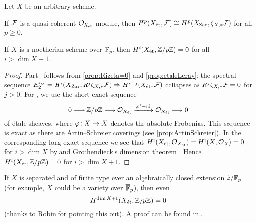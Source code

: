 \begin{cor}\label{cor:etaleCoho=ZariskiCoho}
	Let $X$ be an arbitrary scheme.
	\begin{alphanumerate}
		\item If $\mathcal{F}$ is a quasi-coherent $\mathcal{O}_{X_{\mathrm{\acute{e}t}}}$-module, then $H^p(X_{\mathrm{\acute{e}t}},\mathcal{F})\cong H^p(X_{\mathrm{Zar}},\zeta_{X,*}\mathcal{F})$ for all $p\geq 0$.
		\item If $X$ is a noetherian scheme over $\mathbb{F}_p$, then $H^i(X_{\mathrm{\acute{e}t}},\mathbb{Z}/p\mathbb{Z})=0$ for all $i>\dim X+1$.
	\end{alphanumerate}
\end{cor}
\begin{proof}
	Part~ follows from \cref{prop:Rizeta=0} and \cref{prop:etaleLeray}: the spectral sequence $E_2^{i,j}=H^i(X_\Zar,R^j\zeta_{X,*}\Ff)\converge H^{i+j}(X_\et,\Ff)$ collapses as $R^j\zeta_{X,*}\mathcal{F}=0$ for $j>0$. For , we use the short exact sequence
	\begin{equation*}
	0\morphism \IZ/p\IZ\morphism \Oo_{X_\et}\xrightarrow{\phi^*-\id}\Oo_{X_\et}\morphism 0
	\end{equation*}
	of étale sheaves, where $\phi\colon X\morphism X$ denotes the absolute Frobenius. This sequence is exact as there are Artin--Schreier coverings (see \cref{prop:ArtinSchreier}). In the corresponding long exact sequence we see that $H^i(X_{\mathrm{\acute{e}t}},\mathcal{O}_{X_{\mathrm{\acute{e}t}}})=H^i(X,\mathcal{O}_X)=0$ for $i>\dim X$ by  and Grothendieck's dimension theorem \cite[Théorème~3.6.5]{tohoku}. Hence $H^i(X_{\mathrm{\acute{e}t}},\mathbb{Z}/p\mathbb{Z})=0$ for $i>\dim X+1$.
\end{proof}
\begin{rem*}\label{rem*:Z/pZvanishing}
	If $X$ is separated and of finite type over an algebraically closed extension $k/\mathbb{F}_p$ (for example, $X$ could be a variety over $\ov{\IF}_p$), then even
	\begin{equation*}
	H^{\dim X+1}(X_{\mathrm{\acute{e}t}},\mathbb{Z}/p\mathbb{Z})=0
	\end{equation*}
	(thanks to Robin for pointing this out). A proof can be found in \cite[]{stacks-project}.
\end{rem*}
